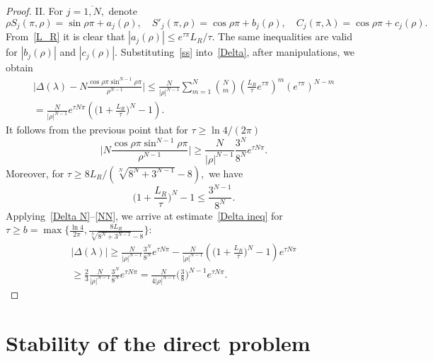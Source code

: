 \documentclass[a4paper, 12pt] {article}
\theoremstyle{plain}
\theoremstyle{remark}
\theoremstyle{plain}
\theoremstyle{definition}
\numberwithin{equation}{section}
\begin{document}
\begin{proof}
II. For $j=\overline{1, N},$ denote
\begin{equation} \label{ss}
\rho S_j(\pi, \rho)= \sin \rho \pi + a_j(\rho), \quad 
S'_j(\pi, \rho) = \cos \rho \pi + b_j(\rho), \quad
C_j(\pi, \lambda) = \cos \rho \pi + c_j(\rho).
\end{equation}
From~\eqref{L_R} it is clear that
$|a_j(\rho)| \le e^{\tau \pi}L_R/\tau.$
The same inequalities are valid for $|b_j(\rho)|$ and $|c_j(\rho)|.$ Substituting~\eqref{ss} into~\eqref{Delta}, after manipulations, we obtain
\begin{equation} \label{Delta N}
\begin{split}
\Big|\Delta(\lambda) - N \frac{\cos \rho \pi \sin^{N-1} \rho\pi}{\rho^{N-1}}\Big| \le
\frac{N}{|\rho|^{N-1}} \sum_{m=1}^N {N\choose m} \left(\frac{L_R}{\tau}e^{\tau \pi}\right)^m (e^{\tau \pi})^{N-m}\\
= \frac{N}{|\rho|^{N-1}} e^{\tau N \pi} \left( \Big( 1 + \frac{L_R}{\tau}\Big)^N - 1\right).
\end{split}
\end{equation}
It follows from the previous point that for $\tau \ge \ln 4/(2 \pi)$
\begin{equation} \label{Delta est}
\Big|N\frac{\cos \rho \pi \sin^{N-1} \rho\pi}{\rho^{N-1}}\Big| \ge \frac{N}{|\rho|^{N-1}}\frac{3^N}{8^N} e^{\tau N\pi}.
\end{equation}
Moreover, for
$\tau \ge 8L_R /(\sqrt[N]{8^N + 3^{N-1}}-8),$
we have
\begin{equation} \label{NN}
\Big( 1 + \frac{L_R}{\tau}\Big)^N - 1 \le \frac{3^{N-1}}{8^N}.
\end{equation}
Applying~\eqref{Delta N}--\eqref{NN}, we arrive at estimate~\eqref{Delta ineq} for $\tau \ge b = \max \Big\{ \frac{\ln 4}{2 \pi}, \frac{8L_R}{\sqrt[N]{8^N + 3^{N-1}}-8} \Big\}:$
\begin{equation*}
\begin{split}
|\Delta(\lambda)| \ge \frac{N}{|\rho|^{N-1}}\frac{3^N}{8^N} e^{\tau N\pi} - \frac{N}{|\rho|^{N-1}} \left( \Big( 1 + \frac{L_R}{\tau}\Big)^N - 1\right) e^{\tau N\pi} \\ \ge\frac23 \frac{N}{|\rho|^{N-1}} \frac{3^N}{8^N} e^{\tau N\pi} =
\frac{N}{4|\rho|^{N-1}} \Big(\frac{3}{8}\Big)^{N-1} e^{\tau N \pi}.
\end{split}
\end{equation*}
\end{proof}

\section{Stability of the direct problem} \label{direct problem}
\end{document}
